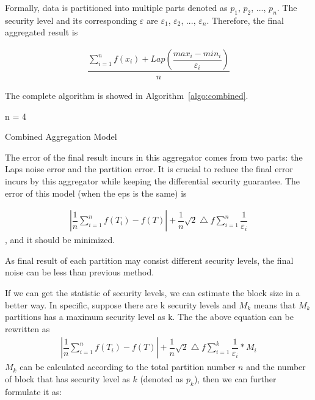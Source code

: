 Formally, data is partitioned into multiple parts denoted as $p_1$, $p_2$, ..., 
$p_n$.
The security level and its corresponding $\varepsilon$ are $\varepsilon_1$,
$\varepsilon_2$, ..., $\varepsilon_n$. Therefore, the final aggregated result
is

\begin{align}
\dfrac{\sum\limits_{i=1}^n f(x_i) + Lap(\dfrac{max_i - 
min_i}{\varepsilon_i})}{n}
\end{align}

The complete algorithm is showed in Algorithm~\ref{algo:combined}.

\begin{algorithm}[t]
\SetAlgoLined
{}
  n = 4

 \caption{Combined Aggregation Model}
 \label{algo:combined}
\end{algorithm}

The error of the final result incurs in this aggregator comes from two parts:
the Laps noise error and the partition error. It is crucial to reduce the final
error incurs by this aggregator while keeping the differential security 
guarantee.
The error of this model (when the eps is the same) is

\begin{align}
|\dfrac{1}{n}\sum\limits_{i=1}^n f(T_i) - f(T)| + 
\dfrac{1}{n}\sqrt{2}\bigtriangleup{f}\sum\limits_{i=1}^n\dfrac{1}{\varepsilon_i}
\end{align}, and it should be minimized.

As final result of each partition may consist
different security levels, the final noise can be less than previous method.

If we can get the statistic of security levels, we can estimate the block
size in a better way. In specific, suppose there are k security levels and
$M_k$ means that $M_k$ partitions has a maximum security level as k. The the
above equation can be rewritten as
\begin{align}
  |\dfrac{1}{n}\sum\limits_{i=1}^n f(T_i) - f(T)| +  
\dfrac{1}{n}\sqrt{2}\bigtriangleup{f}\sum\limits_{i=1}^k\dfrac{1}{\varepsilon_i} 
* M_i
\end{align}
$M_k$ can be calculated according to the total partition number $n$ and
the number of block that has security level as $k$ (denoted as $p_k$), then
we can further formulate it as:


